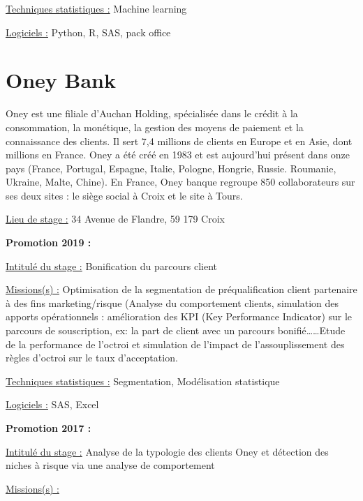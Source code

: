 \documentclass[
  letterpaper,
  DIV=11,
  numbers=noendperiod]{scrreprt}
\begin{document}
\uline{Techniques statistiques :} Machine learning

\uline{Logiciels :} Python, R, SAS, pack office

\hypertarget{oney-bank}{%
\section{\texorpdfstring{\textbf{Oney
Bank}}{Oney Bank}}\label{oney-bank}}

Oney est une filiale d'Auchan Holding, spécialisée dans le crédit à la
consommation, la monétique, la gestion des moyens de paiement et la
connaissance des clients. Il sert 7,4 millions de clients en Europe et
en Asie, dont millions en France. Oney a été créé en 1983 et est
aujourd'hui présent dans onze pays (France, Portugal, Espagne, Italie,
Pologne, Hongrie, Russie. Roumanie, Ukraine, Malte, Chine). En France,
Oney banque regroupe 850 collaborateurs sur ses deux sites : le siège
social à Croix et le site à Tours.

\uline{Lieu de stage :} 34 Avenue de Flandre, 59 179 Croix

\textbf{Promotion 2019 :}

\uline{Intitulé du stage :} Bonification du parcours client

\uline{Missions(s) :} Optimisation de la segmentation de
préqualification client partenaire à des fins marketing/risque (Analyse
du comportement clients, simulation des apports opérationnels :
amélioration des KPI (Key Performance Indicator) sur le parcours de
souscription, ex: la part de client avec un parcours
bonifié\ldots\ldots Etude de la performance de l'octroi et simulation de
l'impact de l'assouplissement des règles d'octroi sur le taux
d'acceptation.

\uline{Techniques statistiques :} Segmentation, Modélisation statistique

\uline{Logiciels :} SAS, Excel

\textbf{Promotion 2017 :}

\uline{Intitulé du stage :} Analyse de la typologie des clients Oney et
détection des niches à risque via une analyse de comportement

\uline{Missions(s) :}
\end{document}
